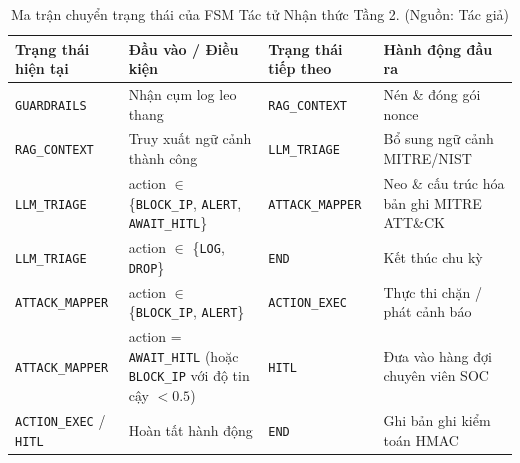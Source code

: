 \begin{table}[!htbp]
    \centering
    \caption{Ma trận chuyển trạng thái của FSM Tác tử Nhận thức Tầng 2. (Nguồn: Tác giả)}
    \label{tab:agent_fsm_transitions}
    \begin{tabular}{|>{\raggedright\arraybackslash}p{}|>{\raggedright\arraybackslash}p{}|>{\raggedright\arraybackslash}p{}|>{\raggedright\arraybackslash}p{}|}
        \hline
        \textbf{Trạng thái hiện tại} & \textbf{Đầu vào / Điều kiện} & \textbf{Trạng thái tiếp theo} & \textbf{Hành động đầu ra} \\
        \hline
        \texttt{GUARDRAILS} & Nhận cụm log leo thang & \texttt{RAG\_CONTEXT} & Nén \& đóng gói nonce \\
        \hline
        \texttt{RAG\_CONTEXT} & Truy xuất ngữ cảnh thành công & \texttt{LLM\_TRIAGE} & Bổ sung ngữ cảnh MITRE\slash NIST \\
        \hline
        \texttt{LLM\_TRIAGE} & action $\in$ \{\texttt{BLOCK\_IP}, \texttt{ALERT}, \texttt{AWAIT\_HITL}\} & \texttt{ATTACK\_MAPPER} & Neo \& cấu trúc hóa bản ghi MITRE ATT\&CK \\
        \hline
        \texttt{LLM\_TRIAGE} & action $\in$ \{\texttt{LOG}, \texttt{DROP}\} & \texttt{END} & Kết thúc chu kỳ \\
        \hline
        \texttt{ATTACK\_MAPPER} & action $\in$ \{\texttt{BLOCK\_IP}, \texttt{ALERT}\} & \texttt{ACTION\_EXEC} & Thực thi chặn / phát cảnh báo \\
        \hline
        \texttt{ATTACK\_MAPPER} & action = \texttt{AWAIT\_HITL} (hoặc \texttt{BLOCK\_IP} với độ tin cậy $<0.5$) & \texttt{HITL} & Đưa vào hàng đợi chuyên viên SOC \\
        \hline
        \texttt{ACTION\_EXEC} / \texttt{HITL} & Hoàn tất hành động & \texttt{END} & Ghi bản ghi kiểm toán HMAC \\
        \hline
    \end{tabular}
\end{table}

